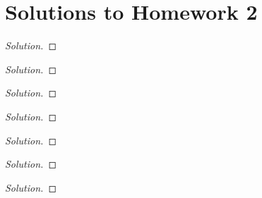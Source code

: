\chapter{Solutions to Homework 2}

\begin{problem}

\end{problem}
\begin{proof}[Solution]
\end{proof}

\begin{problem}

\end{problem}
\begin{proof}[Solution]
\end{proof}

\begin{problem}

\end{problem}
\begin{proof}[Solution]
\end{proof}

\begin{problem}

\end{problem}
\begin{proof}[Solution]
\end{proof}

\begin{problem}

\end{problem}
\begin{proof}[Solution]
\end{proof}

\begin{problem}

\end{problem}
\begin{proof}[Solution]
\end{proof}


\begin{problem}

\end{problem}
\begin{proof}[Solution]
\end{proof}


